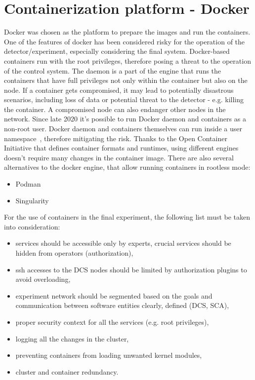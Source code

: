 \section{Containerization platform - Docker}
Docker was chosen as the platform to prepare the images and run the containers. One of the features of docker has been considered risky for the operation of the detector/experiment, especially considering the final system. Docker-based containers run with the root privileges, therefore posing a threat to the operation of the control system. The daemon is a part of the engine that runs the containers that have full privileges not only within the container but also on the node. If a container gets compromised, it may lead to potentially disastrous scenarios, including loss of data or potential threat to the detector - e.g. killing the container. A compromised node can also endanger other nodes in the network.  Since late 2020 it's possible to run Docker daemon and containers as a non-root user. Docker daemon and containers themselves can run inside a user namespace~\cite{docker_limitations}, therefore mitigating the risk.
 Thanks to the Open Container Initiative that defines container formats and runtimes, using different engines doesn't require many changes in the container image. There are also several alternatives to the docker engine, that allow running containers in rootless mode:
\begin{itemize}
    \item Podman~\cite{Podman} 
    \item Singularity~\cite{singularity}
\end{itemize}

For the use of containers in the final experiment, the following list must be taken into consideration:

\begin{itemize}
    \item services should be accessible only by experts, crucial services should be hidden from operators (authorization),
    \item ssh accesses to the DCS nodes should be limited by authorization plugins to avoid overloading,
    \item experiment network should be segmented based on the goals and communication between software entities clearly, defined (\gls{DCS}, \gls{SCA}),
    \item proper security context for all the services (e.g. root privileges),
    \item logging all the changes in the cluster,
    \item preventing containers from loading unwanted kernel modules,
    \item cluster and container redundancy.
\end{itemize}



